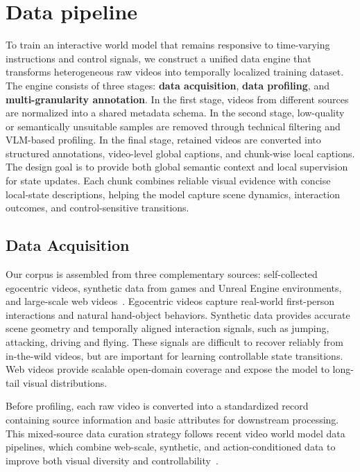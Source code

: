 \section{Data pipeline} \label{sec:data}

To train an interactive world model that remains responsive to time-varying instructions and control signals, we construct a unified data engine that transforms heterogeneous raw videos into temporally localized training dataset. The engine consists of three stages: \textbf{data acquisition}, \textbf{data profiling}, and \textbf{multi-granularity annotation}. 
In the first stage, videos from different sources are normalized into a shared metadata schema. In the second stage, low-quality or semantically unsuitable samples are removed through technical filtering and VLM-based profiling. 
In the final stage, retained videos are converted into structured annotations, video-level global captions, and chunk-wise local captions. The design goal is to provide both global semantic context and local supervision for state updates. Each chunk combines reliable visual evidence with concise local-state descriptions, helping the model capture scene dynamics, interaction outcomes, and control-sensitive transitions.

\subsection{Data Acquisition}

Our corpus is assembled from three complementary sources: self-collected egocentric videos, synthetic data from games and Unreal Engine environments, and large-scale web videos~\cite{yang2026aoe,wang2025spatialvid,grauman2022ego4d,buildaiegocentric10k2025,damen2020epic,egodex,bansal2022my,jang2019epic}. Egocentric videos capture real-world first-person interactions and natural hand-object behaviors. Synthetic data provides accurate scene geometry and temporally aligned interaction signals, such as jumping, attacking, driving and flying. These signals are difficult to recover reliably from in-the-wild videos, but are important for learning controllable state transitions. Web videos provide scalable open-domain coverage and expose the model to long-tail visual distributions.

Before profiling, each raw video is converted into a standardized record containing source information and basic attributes for downstream processing. This mixed-source data curation strategy follows recent video world model data pipelines, which combine web-scale, synthetic, and action-conditioned data to improve both visual diversity and controllability~\cite{xiong2026actworld,lingbot-world,cosmos}.


